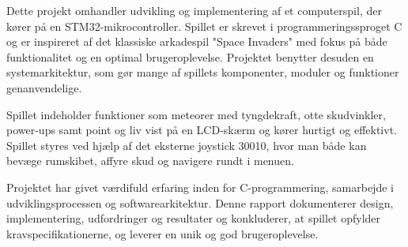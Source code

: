 Dette projekt omhandler udvikling og implementering af et computerspil, der kører på en STM32-mikrocontroller. Spillet er skrevet i programmeringssproget C og er inspireret af det klassiske arkadespil "Space Invaders" med fokus på både funktionalitet og en optimal brugeroplevelse. Projektet benytter desuden en systemarkitektur, som gør mange af spillets komponenter, moduler og funktioner genanvendelige.

Spillet indeholder funktioner som meteorer med tyngdekraft, otte skudvinkler, power-ups samt point og liv vist på en LCD-skærm og kører hurtigt og effektivt. Spillet styres ved hjælp af det eksterne joystick 30010, hvor man både kan bevæge rumskibet, affyre skud og navigere rundt i menuen.

Projektet har givet værdifuld erfaring inden for C-programmering, samarbejde i udviklingsprocessen og softwarearkitektur. Denne rapport dokumenterer design, implementering, udfordringer og resultater og konkluderer, at spillet opfylder kravspecifikationerne, og leverer en unik og god brugeroplevelse.